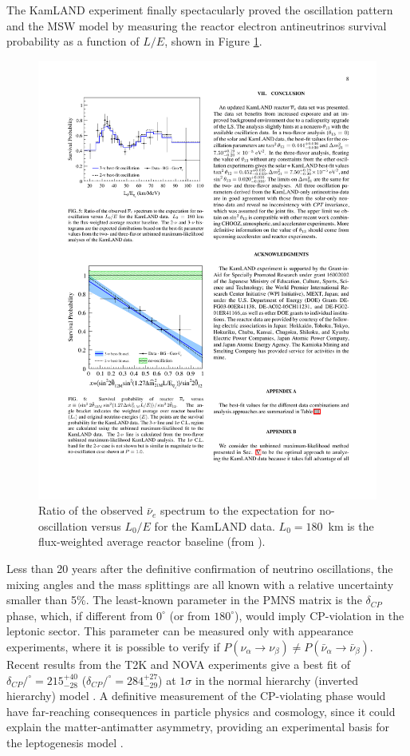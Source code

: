 \vspace{1em}

The KamLAND experiment finally spectacularly proved the oscillation pattern and the MSW model by measuring the reactor electron antineutrinos survival probability as a function of $L/E$, shown in Figure \ref{fig:kamland}. 

\begin{figure}[htbp]
    \centering
    \includegraphics[width=0.75\linewidth]{figures/kamland.pdf}
    \caption{Ratio of the observed $\bar{\nu}_{e}$ spectrum to the expectation for no-oscillation versus $L_{0}/E$ for the KamLAND data. $L_{0} = 180$~km is the flux-weighted average reactor baseline (from \cite{Gando:2010aa}).}
    \label{fig:kamland}
\end{figure}

Less than 20 years after the definitive confirmation of neutrino oscillations, the mixing angles and the mass splittings are all known with a relative uncertainty smaller than 5\%. The least-known parameter in the PMNS matrix is the $\delta_{CP}$ phase, which, if different from $0^{\circ}$ (or from $180^{\circ}$), would imply CP-violation in the leptonic sector. This parameter can be measured only with appearance experiments, where it is possible to verify if
$P(\nu_{\alpha}\rightarrow\nu_{\beta}) \neq P(\bar{\nu}_{\alpha}\rightarrow\bar{\nu}_{\beta})$. Recent results from the T2K and NOVA experiments give a best fit of $\delta_{CP}/^{\circ}=215^{+40}_{-28}$  ($\delta_{CP}/^{\circ}=284^{+27}_{-29}$) at $1\sigma$ in the normal hierarchy (inverted hierarchy) model \cite{Esteban:2018azc}. A definitive measurement of the CP-violating phase would have far-reaching consequences in particle physics and cosmology, since it could explain the matter-antimatter asymmetry, providing an experimental basis for the leptogenesis model \cite{Fukugita:1986hr}.


